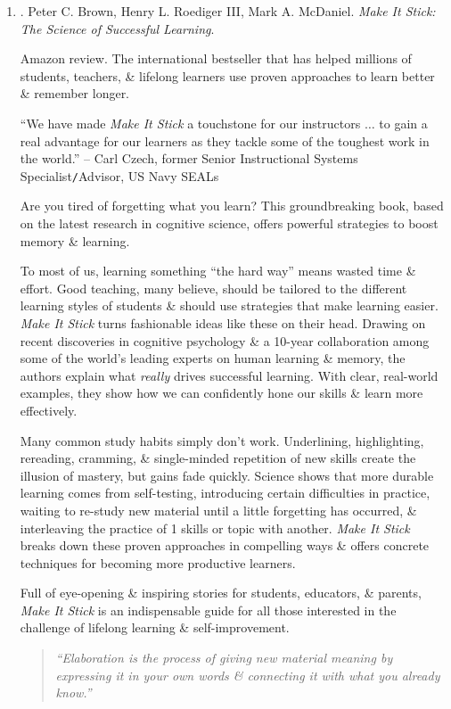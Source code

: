 \documentclass{article}
\begin{document}
\begin{enumerate}
	\item \cite{Brown_Roediger_McDaniel_stick}. {\sc Peter C. Brown, Henry L. Roediger III, Mark A. McDaniel}. {\it Make It Stick: The Science of Successful Learning}.
	
	{\sf Amazon review.} The international bestseller that has helped millions of students, teachers, \& lifelong learners use proven approaches to learn better \& remember longer.
	
	``We have made {\it Make It Stick} a touchstone for our instructors $\ldots$ to gain a real advantage for our learners as they tackle some of the toughest work in the world.'' -- {\sc Carl Czech}, former Senior Instructional Systems Specialist{\tt/}Advisor, US Navy SEALs
	
	Are you tired of forgetting what you learn? This groundbreaking book, based on the latest research in cognitive science, offers powerful strategies to boost memory \& learning.
	
	To most of us, learning something ``the hard way'' means wasted time \& effort. Good teaching, many believe, should be tailored to the different learning styles of students \& should use strategies that make learning easier. {\it Make It Stick} turns fashionable ideas like these on their head. Drawing on recent discoveries in cognitive psychology \& a 10-year collaboration among some of the world's leading experts on human learning \& memory, the authors explain what {\it really} drives successful learning. With clear, real-world examples, they show how we can confidently hone our skills \& learn more effectively.
	
	Many common study habits simply don't work. Underlining, highlighting, rereading, cramming, \& single-minded repetition of new skills create the illusion of mastery, but gains fade quickly. Science shows that more durable learning comes from self-testing, introducing certain difficulties in practice, waiting to re-study new material until a little forgetting has occurred, \& interleaving the practice of 1 skills or topic with another. {\it Make It Stick} breaks down these proven approaches in compelling ways \& offers concrete techniques for becoming more productive learners.
	
	Full of eye-opening \& inspiring stories for students, educators, \& parents, {\it Make It Stick} is an indispensable guide for all those interested in the challenge of lifelong learning \& self-improvement.
	\begin{quotation}
		{\it``Elaboration is the process of giving new material meaning by expressing it in your own words \& connecting it with what you already know.''}
		

\end{quotation}
\end{enumerate}
\end{document}
